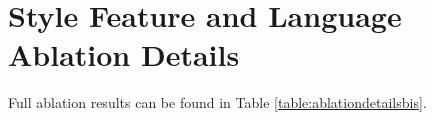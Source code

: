 \section{Style Feature and Language Ablation Details}
\label{sec:appendix:ablationdetails}

Full ablation results can be found in Table \ref{table:ablationdetailsbis}.

